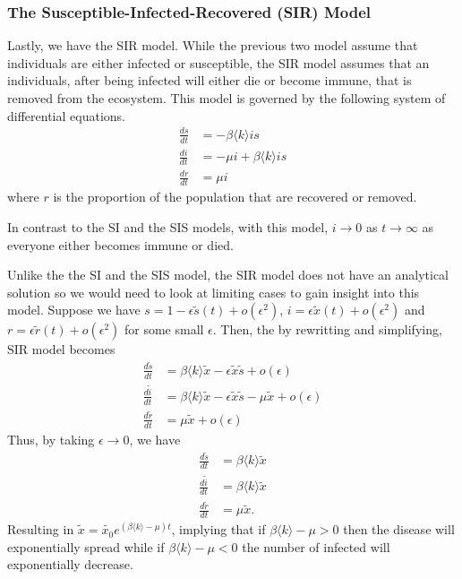 \documentclass[
]{article}
\theoremstyle{definition}
\begin{document}
\hypertarget{the-susceptible-infected-recovered-sir-model}{%
\subsubsection{The Susceptible-Infected-Recovered (SIR)
Model}\label{the-susceptible-infected-recovered-sir-model}}

Lastly, we have the SIR model. While the previous two model assume that
individuals are either infected or susceptible, the SIR model assumes
that an individuals, after being infected will either die or become
immune, that is removed from the ecosystem. This model is governed by
the following system of differential equations. \begin{align*}
  \frac{ds}{dt} & = -\beta \langle k \rangle is\\
  \frac{di}{dt} & = - \mu i + \beta \langle k \rangle is\\
  \frac{dr}{dt} & = \mu i
\end{align*} where \(r\) is the proportion of the population that are
recovered or removed.

In contrast to the SI and the SIS models, with this model, \(i \to 0\)
as \(t \to \infty\) as everyone either becomes immune or died.

Unlike the the SI and the SIS model, the SIR model does not have an
analytical solution so we would need to look at limiting cases to gain
insight into this model. Suppose we have
\(s = 1 - \epsilon \tilde{s}(t) + o(\epsilon^2)\),
\(i = \epsilon \tilde{x}(t) + o(\epsilon^2)\) and
\(r = \epsilon \tilde{r}(t) + o(\epsilon^2)\) for some small
\(\epsilon\). Then, the by rewritting and simplifying, SIR model becomes
\begin{align*}
  \frac{d\tilde{s}}{dt} & = \beta \langle k \rangle \tilde{x} - 
    \epsilon \tilde{x} \tilde{s} + o(\epsilon)\\
  \frac{d\tilde{i}}{dt} & = \beta \langle k \rangle \tilde{x} - 
    \epsilon \tilde{x} \tilde{s} - \mu \tilde{x} + o(\epsilon)\\
  \frac{d\tilde{r}}{dt} & = \mu \tilde{x} + o(\epsilon)
\end{align*} Thus, by taking \(\epsilon \to 0\), we have \begin{align*}
  \frac{d\tilde{s}}{dt} & = \beta \langle k \rangle \tilde{x}\\
  \frac{d\tilde{i}}{dt} & = \beta \langle k \rangle \tilde{x}\\
  \frac{d\tilde{r}}{dt} & = \mu \tilde{x}.
\end{align*} Resulting in
\(\tilde{x} = \tilde{x_0}e^{(\beta \langle k \rangle - \mu)t}\),
implying that if \(\beta \langle k \rangle - \mu > 0\) then the disease
will exponentially spread while if \(\beta \langle k \rangle - \mu < 0\)
the number of infected will exponentially decrease.
\end{document}
